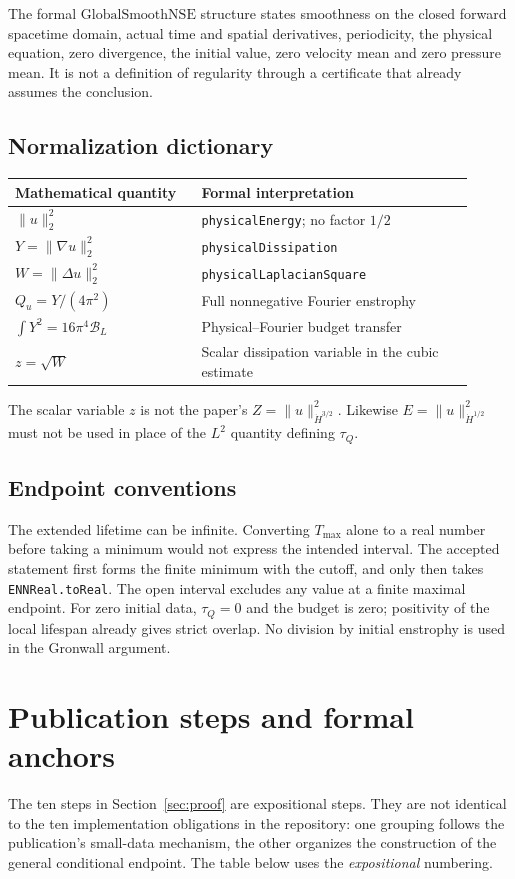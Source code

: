 \documentclass[11pt,a4paper]{article}
\numberwithin{equation}{section}
\theoremstyle{plain}
\theoremstyle{definition}
\theoremstyle{remark}
\newcommand{\HH}[1]{\dot H^{#1}}
\newcommand{\norm}[2]{\lVert #1\rVert_{#2}}
\newcommand{\Tmax}{T_{\max}}
\newcommand{\tq}{\tau_Q}
\newcommand{\Budget}{\mathcal B}
\newcommand{\decl}[1]{\begingroup\small\nolinkurl{#1}\endgroup}
\begin{document}
The formal $\mathrm{GlobalSmoothNSE}$ structure states smoothness on the
closed forward spacetime domain, actual time and spatial derivatives,
periodicity, the physical equation, zero divergence, the initial value,
zero velocity mean and zero pressure mean. It is not a definition of
regularity through a certificate that already assumes the conclusion.

\subsection{Normalization dictionary}
\begin{center}
\begin{tabular}{p{0.37\linewidth}p{0.54\linewidth}}
\toprule
Mathematical quantity & Formal interpretation\\
\midrule
$\norm{u}{2}^2$ & \decl{physicalEnergy}; no factor $1/2$\\[4pt]
$Y=\norm{\nabla u}{2}^2$ & \decl{physicalDissipation}\\[4pt]
$W=\norm{\Delta u}{2}^2$ & \decl{physicalLaplacianSquare}\\[4pt]
$Q_u=Y/(4\pi^2)$ & Full nonnegative Fourier enstrophy\\[4pt]
$\int Y^2=16\pi^4\Budget_L$ & Physical--Fourier budget transfer\\[4pt]
$z=\sqrt W$ & Scalar dissipation variable in the cubic estimate\\
\bottomrule
\end{tabular}
\end{center}
The scalar variable $z$ is not the paper's $Z=\norm{u}{\HH{3/2}}^2$.
Likewise $E=\norm{u}{\HH{1/2}}^2$ must not be used in place of the
$L^2$ quantity defining $\tq$.

\subsection{Endpoint conventions}
The extended lifetime can be infinite. Converting $\Tmax$ alone to a
real number before taking a minimum would not express the intended
interval. The accepted statement first forms the finite minimum with
the cutoff, and only then takes \decl{ENNReal.toReal}.
The open interval excludes any value at a finite maximal endpoint.
For zero initial data, $\tq=0$ and the budget is zero; positivity of the
local lifespan already gives strict overlap. No division by initial
enstrophy is used in the Gronwall argument.

\section{Publication steps and formal anchors}\label{app:anchors}
The ten steps in Section~\ref{sec:proof} are expositional steps. They are
not identical to the ten implementation obligations in the repository:
one grouping follows the publication's small-data mechanism, the other
organizes the construction of the general conditional endpoint.
The table below uses the \emph{expositional} numbering.
\end{document}
